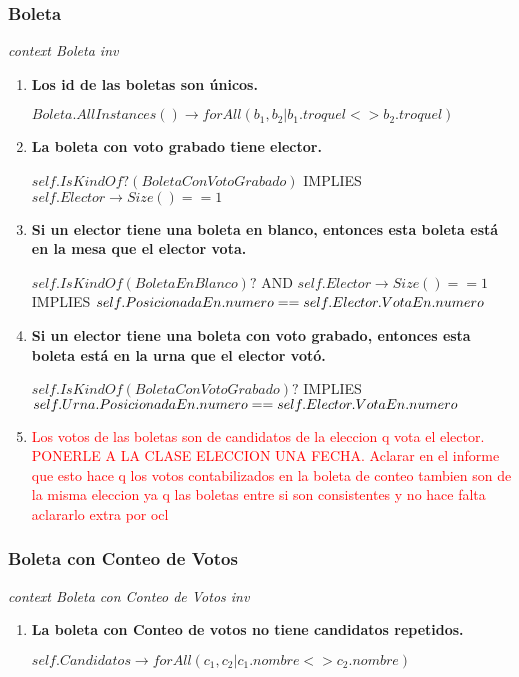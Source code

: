 \subsubsection*{Boleta}

\textit{context Boleta
inv}

\begin{enumerate}

\item \textbf{Los id de las boletas son únicos.}

$Boleta.AllInstances() \rightarrow forAll(b_1, b_2 | b_1.troquel <> b_2.troquel)$

\item \textbf{La boleta con voto grabado tiene elector.}

$self.IsKindOf?(BoletaConVotoGrabado)$  IMPLIES  $self.Elector \rightarrow Size() == 1 $

\item \textbf{Si un elector tiene una boleta en blanco, entonces esta boleta está en la mesa que el elector vota.}

$self.IsKindOf(BoletaEnBlanco)?$ AND $self.Elector \rightarrow Size() == 1 $ IMPLIES $\\
self.PosicionadaEn.numero == self.Elector.VotaEn.numero$

\item \textbf{Si un elector tiene una boleta con voto grabado, entonces esta boleta está en la urna que el elector vot\'o.}

$self.IsKindOf(BoletaConVotoGrabado)? $  IMPLIES  $\\
self.Urna.PosicionadaEn.numero == self.Elector.VotaEn.numero$

\item \textcolor{red}{Los votos de las boletas son de candidatos de la eleccion q vota el elector. PONERLE A LA CLASE ELECCION UNA FECHA. Aclarar en el informe que esto hace q los votos contabilizados en la boleta de conteo tambien son de la misma eleccion ya q las boletas entre si son consistentes y no hace falta aclararlo extra por ocl}

\end{enumerate}

\subsubsection*{Boleta con Conteo de Votos}

\textit{context Boleta con Conteo de Votos
inv}

\begin{enumerate}
\item \textbf{La boleta con Conteo de votos no tiene candidatos repetidos.}

$self.Candidatos \rightarrow forAll(c_1, c_2| c_1.nombre <> c_2.nombre)$

\end{enumerate}
